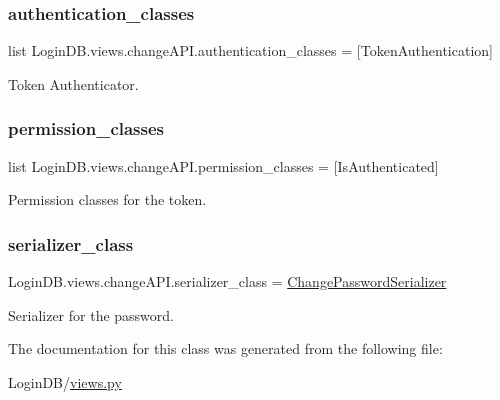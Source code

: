 \subsubsection{\texorpdfstring{authentication\+\_\+classes}{authentication\_classes}}
{\footnotesize\ttfamily list Login\+D\+B.\+views.\+change\+A\+P\+I.\+authentication\+\_\+classes = \mbox{[}Token\+Authentication\mbox{]}\hspace{0.3cm}{\ttfamily [static]}}



Token Authenticator. 

\mbox{\label{class_login_d_b_1_1views_1_1change_a_p_i_abf9d3bacee7d5cf40fc1e020cf80f6bc}} 
\subsubsection{\texorpdfstring{permission\+\_\+classes}{permission\_classes}}
{\footnotesize\ttfamily list Login\+D\+B.\+views.\+change\+A\+P\+I.\+permission\+\_\+classes = \mbox{[}Is\+Authenticated\mbox{]}\hspace{0.3cm}{\ttfamily [static]}}



Permission classes for the token. 

\mbox{\label{class_login_d_b_1_1views_1_1change_a_p_i_a3141d145ac66952145f71ea12f9bced7}} 
\subsubsection{\texorpdfstring{serializer\+\_\+class}{serializer\_class}}
{\footnotesize\ttfamily Login\+D\+B.\+views.\+change\+A\+P\+I.\+serializer\+\_\+class = \hyperlink{class_login_d_b_1_1serializers_1_1_change_password_serializer}{Change\+Password\+Serializer}\hspace{0.3cm}{\ttfamily [static]}}



Serializer for the password. 



The documentation for this class was generated from the following file\+:\begin{DoxyCompactItemize}
\item 
Login\+D\+B/\hyperlink{views_8py}{views.\+py}\end{DoxyCompactItemize}
